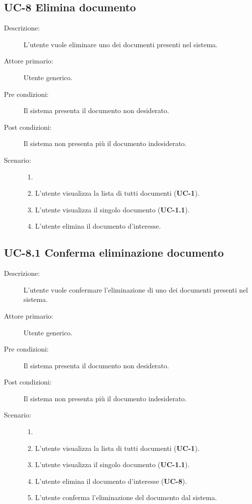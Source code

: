 \subsection{UC-8 Elimina documento}
\begin{description}
    \item[Descrizione:] L'utente vuole eliminare uno dei documenti presenti nel sistema.
    \item[Attore primario:] Utente generico.
    \item[Pre condizioni:] Il sistema presenta il documento non desiderato.
    \item[Post condizioni:] Il sistema non presenta più il documento indesiderato.
    \item[Scenario:]
    \begin{enumerate}
        \item[]
        \item L’utente visualizza la lista di tutti documenti (\textbf{UC-1}).
        \item L'utente visualizza il singolo documento (\textbf{UC-1.1}).
        \item L'utente elimina il documento d'interesse.
    \end{enumerate} 
\end{description}

\subsection{UC-8.1 Conferma eliminazione documento}
\begin{description}
    \item[Descrizione:] L'utente vuole confermare l'eliminazione di uno dei documenti presenti nel sistema.
    \item[Attore primario:] Utente generico.
    \item[Pre condizioni:] Il sistema presenta il documento non desiderato.
    \item[Post condizioni:] Il sistema non presenta più il documento indesiderato.
    \item[Scenario:] 
    \begin{enumerate}
        \item[]
        \item L’utente visualizza la lista di tutti documenti (\textbf{UC-1}).
        \item L'utente visualizza il singolo documento (\textbf{UC-1.1}).
        \item L'utente elimina il documento d'interesse (\textbf{UC-8}).
        \item L'utente conferma l'eliminazione del documento dal sistema.
    \end{enumerate}
    
\end{description}

